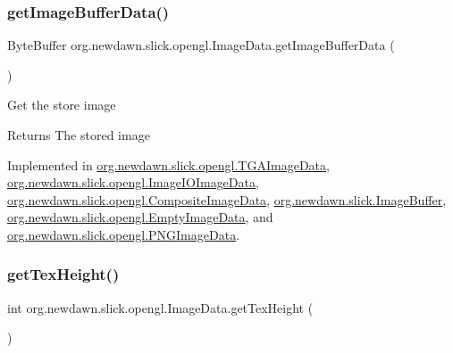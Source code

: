 \subsubsection{\texorpdfstring{get\+Image\+Buffer\+Data()}{getImageBufferData()}}
{\footnotesize\ttfamily Byte\+Buffer org.\+newdawn.\+slick.\+opengl.\+Image\+Data.\+get\+Image\+Buffer\+Data (\begin{DoxyParamCaption}{ }\end{DoxyParamCaption})}

Get the store image

\begin{DoxyReturn}{Returns}
The stored image 
\end{DoxyReturn}


Implemented in \mbox{\hyperlink{classorg_1_1newdawn_1_1slick_1_1opengl_1_1_t_g_a_image_data_a282c69bf240178ff35cb72f91496ba3c}{org.\+newdawn.\+slick.\+opengl.\+T\+G\+A\+Image\+Data}}, \mbox{\hyperlink{classorg_1_1newdawn_1_1slick_1_1opengl_1_1_image_i_o_image_data_a7856e0622b9fcfc5f8667ec4543ed8d0}{org.\+newdawn.\+slick.\+opengl.\+Image\+I\+O\+Image\+Data}}, \mbox{\hyperlink{classorg_1_1newdawn_1_1slick_1_1opengl_1_1_composite_image_data_a3f1eae47b620e0eb4172fb58a87f5894}{org.\+newdawn.\+slick.\+opengl.\+Composite\+Image\+Data}}, \mbox{\hyperlink{classorg_1_1newdawn_1_1slick_1_1_image_buffer_a70b5c0d88ff0fff39cb5bf73a18e402d}{org.\+newdawn.\+slick.\+Image\+Buffer}}, \mbox{\hyperlink{classorg_1_1newdawn_1_1slick_1_1opengl_1_1_empty_image_data_a85ac68637fe36698d04c74ad4b2f4a52}{org.\+newdawn.\+slick.\+opengl.\+Empty\+Image\+Data}}, and \mbox{\hyperlink{classorg_1_1newdawn_1_1slick_1_1opengl_1_1_p_n_g_image_data_abde9855e2ad874c293a3be32494aeee5}{org.\+newdawn.\+slick.\+opengl.\+P\+N\+G\+Image\+Data}}.

\mbox{\label{interfaceorg_1_1newdawn_1_1slick_1_1opengl_1_1_image_data_a316891c94ba43967d0554378c7197324}} 
\subsubsection{\texorpdfstring{get\+Tex\+Height()}{getTexHeight()}}
{\footnotesize\ttfamily int org.\+newdawn.\+slick.\+opengl.\+Image\+Data.\+get\+Tex\+Height (\begin{DoxyParamCaption}{ }\end{DoxyParamCaption})}

